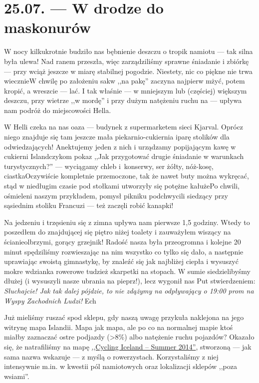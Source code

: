 \chapter*{25.07. --- W drodze do maskonurów}

W nocy kilkukrotnie budziło nas bębnienie deszczu o tropik namiotu --- tak silna była ulewa! Nad ranem przeszła, więc zarządziliśmy sprawne śniadanie i zbiórkę --- przy wciąż jeszcze w miarę stabilnej pogodzie. Niestety, nic co piękne nie trwa wiecznie\textellipsis W chwilę po założeniu sakw ,,na pakę'' zaczyna najpierw mżyć, potem kropić, a wreszcie --- lać. I tak właśnie --- w mniejszym lub (częściej) większym deszczu, przy wietrze ,,w mordę'' i przy dużym natężeniu ruchu na  --- upływa nam podróż do miejscowości Hella.

W Helli czeka na nas oaza --- budynek z supermarketem sieci Kjarval. Oprócz niego znajduje się tam jeszcze mała piekarnio-cukiernia i\textellipsis parę stolików dla odwiedzających! Anektujemy jeden z nich i urządzamy popijającym kawę w cukierni Islandczykom pokaz ,,Jak przygotować drugie śniadanie w warunkach turystycznych?'' --- wyciągamy chleb i~konserwy, ser żółty, nóż-kosę, ciastka\textellipsis Oczywiście kompletnie przemoczone, tak że nawet buty można wykręcać, stąd w niedługim czasie pod stołkami utworzyły się potężne kałuże\textellipsis Po chwili, ośmieleni naszym przykładem, pomysł pikniku podchwycili siedzący przy sąsiednim stoliku Francuzi --- też zaczęli robić kanapki!


Na jedzeniu i trzęsieniu się z zimna upływa nam pierwsze 1,5 godziny. Wtedy to poszedłem do znajdującej się piętro niżej toalety i zauważyłem wiszący na ścianie\textellipsis olbrzymi, gorący grzejnik! Radość nasza była przeogromna i kolejne 20 minut spędziliśmy rozwieszając na nim wszystko co tylko się dało, a następnie uprawiając swoistą gimnastykę, by znaleźć się jak najbliżej ciepła i wysuszyć mokre wdzianka rowerowe tudzież skarpetki na stopach. W sumie siedzielibyśmy dłużej (i wysuszyli nasze ubrania na pieprz!), lecz wygonił nas Put stwierdzeniem: \emph{Słuchajcie! Jak tak dalej pójdzie, to nie zdążymy na odpływający o 19:00 prom na Wyspy Zachodnich Ludzi!} Ech\textellipsis

Już mieliśmy ruszać spod sklepu, gdy naszą uwagę przykuła naklejona na jego witrynę mapa Islandii. Mapa jak mapa, ale po co na normalnej mapie ktoś miałby zaznaczać ostre podjazdy (>8\%) albo natężenie ruchu pojazdów? Okazało się, że natrafiliśmy na mapę \href{http://www.vegagerdin.is/media/upplysingar-og-utgafa/Cycling-map.pdf}{,,Cycling Iceland -- Summer 2014''}, stworzoną --- jak sama nazwa wskazuje --- z myślą o rowerzystach. Korzystaliśmy z niej intensywnie m.in. w kwestii pól namiotowych oraz lokalizacji sklepów ,,poza wsiami''.

